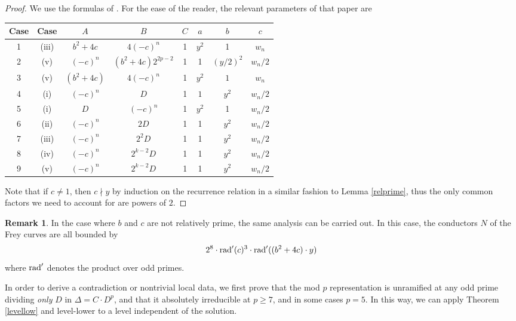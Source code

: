 \documentclass[12pt]{amsart}
\theoremstyle{definition}
\newtheorem{rem}[thm]{Remark}
\newcommand{\rad}{{\rm{rad}}}
\newcommand{\notdiv}{\nmid}
\begin{document}
\begin{proof}
We use the formulas of \cite{bennett04}.  For the ease of the reader, the relevant parameters of that paper are 
\begin{center} 
\begin{tabular}{c | c | c | c | c | c | c | c}
Case & \cite{bennett04} Case & $A$ & $B$ & $C$ & $a$ & $b$ & $c$ \\ \hline \hline
1 & (iii) & $b^2+4c$ & $4(-c)^n$ & 1 & $y^2$ & 1 & $w_n$ \\ \hline
2 & (v) & $(-c)^n$ & $(b^2+4c)2^{2p-2}$ & 1 & 1 & $(y/2)^2$ & $w_n/2$ \\ \hline
3 & (v) & $(b^2+4c)$ & $4(-c)^n$ & 1 & $y^2$ & $1$ & $w_n$ \\ \hline
4 & (i) & $(-c)^n$ & $D$ & 1 & $1$ & $y^2$ & $w_n/2$ \\ \hline
5 & (i) & $D$ & $(-c)^n$ & 1 & $y^2$ & 1 & $w_n/2$ \\ \hline
6 & (ii) & $(-c)^n$ & $2D$ & 1 & 1 & $y^2$ & $w_n/2$ \\ \hline
7 & (iii) & $(-c)^n$ & $2^2D$ & 1 & 1 & $y^2$ & $w_n/2$ \\ \hline
8 & (iv) & $(-c)^n$ & $2^{k-2}D$ & 1 & 1 & $y^2$ & $w_n/2$ \\ \hline
9 & (v) & $(-c)^n$ & $2^{k-2}D$ & 1 & 1 & $y^2$ & $w_n/2$ \\ \hline
\end{tabular}
\end{center}
Note that if $c \neq 1$, then $c \notdiv y$ by induction on the recurrence relation in a similar fashion to Lemma \ref{relprime}, thus the only common factors we need to account for are powers of $2$.
\end{proof}

\begin{rem}
In the case where $b$ and $c$ are not relatively prime, the same analysis can be carried out.  In this case, the conductors $N$ of the Frey curves are all bounded by 
\[ 2^8 \cdot {\rad}'(c)^3 \cdot {\rad}'((b^2+4c)\cdot y) \]
where $\rad'$ denotes the product over odd primes.
\end{rem}

In order to derive a contradiction or nontrivial local data, we first prove that the mod $p$ representation is unramified at any odd prime dividing \emph{only} $D$ in $\Delta = C \cdot D^p$, and that it absolutely irreducible at $p \geq 7$, and in some cases $p=5$.  In this way, we can apply Theorem \ref{levellow} and level-lower to a level independent of the solution.  
\end{document}
